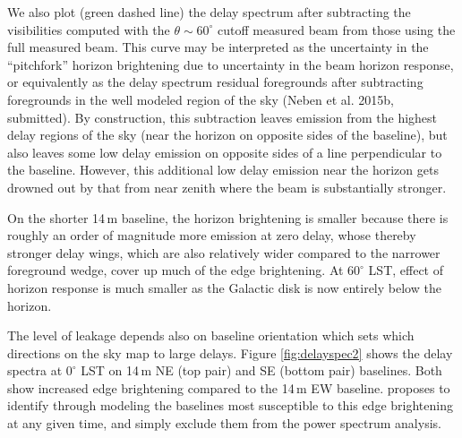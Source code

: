 \documentclass[preprint]{aastex}
\begin{document}
We also plot (green dashed line) the delay spectrum after subtracting the visibilities computed with the $\theta\sim60^\circ$ cutoff measured beam from those using the full measured beam. This curve may be interpreted as the uncertainty in the ``pitchfork'' horizon brightening due to uncertainty in the beam horizon response, or equivalently as the delay spectrum residual foregrounds after subtracting foregrounds in the well modeled region of the sky (Neben et al. 2015b, submitted). By construction, this subtraction leaves emission from the highest delay regions of the sky (near the horizon on opposite sides of the baseline), but also leaves some low delay emission on opposite sides of a line perpendicular to the baseline. However, this additional low delay emission near the horizon gets drowned out by that from near zenith where the beam is substantially stronger. 

On the shorter 14\,m baseline, the horizon brightening is smaller because there is roughly an order of magnitude more emission at zero delay, whose thereby stronger delay wings, which are also relatively wider compared to the narrower foreground wedge, cover up much of the edge brightening. At $60^\circ$ LST, effect of horizon response is much smaller as the Galactic disk is now entirely below the horizon. 

The level of leakage depends also on baseline orientation which sets which directions on the sky map to large delays. Figure \ref{fig:delayspec2} shows the delay spectra at $0^\circ$ LST on 14\,m NE (top pair) and SE (bottom pair) baselines. Both show increased edge brightening compared to the 14\,m EW baseline. \citet{nithya15} proposes to identify through modeling the baselines most susceptible to this edge brightening at any given time, and simply exclude them from the power spectrum analysis. 
\end{document}
